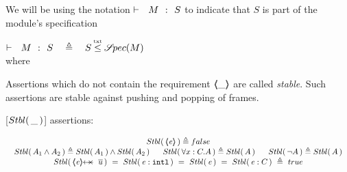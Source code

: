 We will be using the notation ${\vdash \ \ M\ \ \mathbf{:}\ \ S}$ to indicate that $S$ is part of the module's specification

\begin{definition}
\label{d:encaps}
 $\promises M S\ \ \ \triangleq\ \ \ S \txtin \SpecOf M  $
 \\
 where  
 \end{definition} 

Assertions which do not contain the requirement $\langle\!\!\langle \_ \rangle\!\!\rangle$ are called {\emph {stable}}. 
Such assertions are stable against pushing and popping of frames.

\begin{definition}
\label{def:Basic}
[${Stbl(\, \_\, )}$] assertions: %

$
\begin{array}{c}
 \Stable {\inside{\re}}  \triangleq  false
 \\
 \begin{array}{lll}
 \Stable  {A_1  \wedge  A_2}  \triangleq     \Stable  { A_1}  \wedge    \Stable  {A_2}    
 \ \  &  
 \Stable  {\forall x:C.A}   \triangleq   \Stable  {A} \ \ 
 &   
  \Stable  {\neg A}    \triangleq   \Stable A
 \end{array}
 \\ 
   \Stable {\protectedFrom \re {\overline {u}}} \ = \   
  \Stable  {\internal \re}  \ = \   %
    \Stable {\re} \ = \     
     \Stable {\re:C}\   \triangleq \    true
\end{array}
$
\label{f:Basic}
\end{definition}

